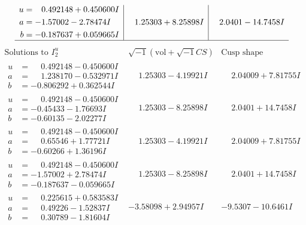 \documentclass[1p]{elsarticle_modified}
\theoremstyle{definition}
\newcommand{\I}{\sqrt{-1}}
\begin{document}
$$\begin{array}{c|c|c}
\begin{aligned}
u &= \phantom{-}0.492148 + 0.450600 I \\
a &= -1.57002 - 2.78474 I \\
b &= -0.187637 + 0.059665 I\end{aligned}
 & \phantom{-}1.25303 + 8.25898 I & \phantom{-}2.0401 - 14.7458 I\\
 \hline 
 \end{array}$$\newpage$$\begin{array}{c|c|c}  
\text{Solutions to }I^u_{2}& \I (\text{vol} + \sqrt{-1}CS) & \text{Cusp shape}\\
 \hline 
\begin{aligned}
u &= \phantom{-}0.492148 - 0.450600 I \\
a &= \phantom{-}1.238170 - 0.532971 I \\
b &= -0.806292 + 0.362544 I\end{aligned}
 & \phantom{-}1.25303 - 4.19921 I & \phantom{-}2.04009 + 7.81755 I \\ \hline\begin{aligned}
u &= \phantom{-}0.492148 - 0.450600 I \\
a &= -0.45433 - 1.76693 I \\
b &= -0.60135 - 2.02277 I\end{aligned}
 & \phantom{-}1.25303 - 8.25898 I & \phantom{-}2.0401 + 14.7458 I \\ \hline\begin{aligned}
u &= \phantom{-}0.492148 - 0.450600 I \\
a &= \phantom{-}0.65546 + 1.77721 I \\
b &= -0.60266 + 1.36196 I\end{aligned}
 & \phantom{-}1.25303 - 4.19921 I & \phantom{-}2.04009 + 7.81755 I \\ \hline\begin{aligned}
u &= \phantom{-}0.492148 - 0.450600 I \\
a &= -1.57002 + 2.78474 I \\
b &= -0.187637 - 0.059665 I\end{aligned}
 & \phantom{-}1.25303 - 8.25898 I & \phantom{-}2.0401 + 14.7458 I \\ \hline\begin{aligned}
u &= \phantom{-}0.225615 + 0.583583 I \\
a &= \phantom{-}0.49226 - 1.52837 I \\
b &= \phantom{-}0.30789 - 1.81604 I\end{aligned}
 & -3.58098 + 2.94957 I & -9.5307 - 10.6461 I \\ \hline\begin{aligned}

\end{aligned}
\end{array}$$
\end{document}
